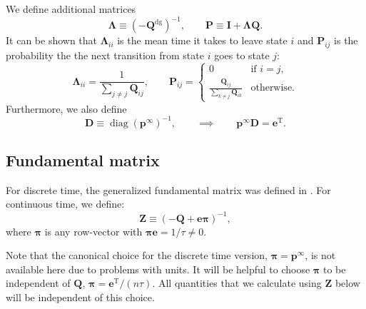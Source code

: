 \documentclass{article} %
\newcommand{\inv}{^{-1}}
\newcommand{\dg}{^\mathrm{dg}}
\newcommand{\trans}{^\mathrm{T}}
\newcommand{\I}{\mathbf{I}}
\newcommand{\onev}{\mathbf{e}}
\newcommand{\MM}{\mathbf{Q}}
\newcommand{\pr}{\mathbf{p}}
\newcommand{\eq}{\pr^\infty}
\newcommand{\fund}{\mathbf{Z}}
\newcommand{\Pb}{\mathbf{P}}
\newcommand{\D}{\mathbf{D}}
\newcommand{\pib}{\boldsymbol{\pi}}
\newcommand{\Lb}{\boldsymbol{\Lambda}}
\begin{document}
We define additional matrices
%
\begin{equation}\label{eq:defDLP}
  \Lb \equiv (-\MM\dg)\inv,
  \qquad
  \Pb \equiv \I + \Lb\MM.
\end{equation}
%
It can be shown that $\Lb_{ii}$ is the mean time it takes to leave state $i$ and $\Pb_{ij}$ is the probability the the next transition from state $i$ goes to state $j$:
%
\begin{equation}\label{eq:LamdaPcmpt}
  \Lb_{ii} = \frac{1}{\sum_{j \neq j} \MM_{ij}},
  \qquad
  \Pb_{ij} = %
  \begin{cases}
     0                                         &\text{if }i=j, \\
     \frac{\MM_{ij}}{\sum_{k \neq j} \MM_{ik}} &\text{otherwise}.
  \end{cases}
\end{equation}
%
Furthermore, we also define
%
\begin{equation}\label{eq:pdotD}
  \D \equiv \operatorname{diag}(\eq)\inv,
  \qquad\implies\qquad
  \eq\D=\onev\trans.
\end{equation}
%

\subsection{Fundamental matrix}\label{sec:fund}

\begin{defn}
  For discrete time, the generalized fundamental matrix was defined in \cite{Kemeny1981const}.
  For continuous time, we define:
  \begin{equation}\label{eq:funddef}
    \fund \equiv (-\MM + \onev\pib)\inv,
  \end{equation}
  where $\pib$ is any row-vector with $\pib\onev=1/\tau\neq0$.
\end{defn}
Note that the canonical choice for the discrete time version, $\pib=\eq$, is not available here due to problems with units.
It will be helpful to choose $\pib$ to be independent of $\MM$, \eg $\pib=\onev\trans/(n\tau)$.
All quantities that we calculate using $\fund$ below will be independent of this choice.
\end{document}
